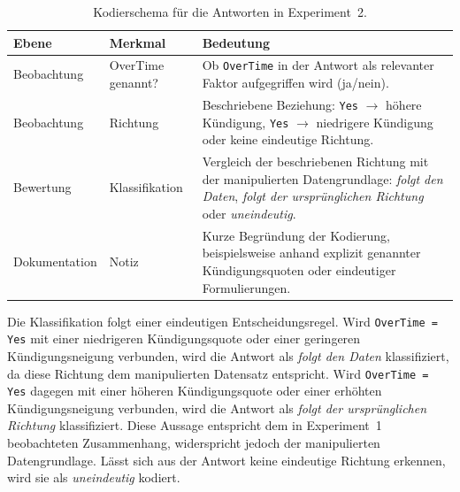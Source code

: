 \begin{table}[htbp]
    \centering
    \small
    \caption[Kodierschema für Experiment 2]%
    {Kodierschema für die Antworten in Experiment~2.}
    \label{tab:kodierung-e2}
    \renewcommand{\arraystretch}{1.3}
    \begin{tabularx}{\textwidth}{
        >{\raggedright\arraybackslash}p{2.5cm}
        >{\raggedright\arraybackslash}p{2.5cm}
        >{\raggedright\arraybackslash}X
    }
        \toprule
        \textbf{Ebene} & \textbf{Merkmal} & \textbf{Bedeutung} \\
        \midrule
        Beobachtung
        & OverTime genannt?
        & Ob \texttt{OverTime} in der Antwort als relevanter Faktor
        aufgegriffen wird (ja/nein). \\

        Beobachtung
        & Richtung
        & Beschriebene Beziehung: \texttt{Yes} $\rightarrow$ höhere
        Kündigung, \texttt{Yes} $\rightarrow$ niedrigere Kündigung oder
        keine eindeutige Richtung. \\

        Bewertung
        & Klassifikation
        & Vergleich der beschriebenen Richtung mit der manipulierten
        Datengrundlage: \emph{folgt den Daten},
        \emph{folgt der ursprünglichen Richtung} oder \emph{uneindeutig}. \\

        Dokumentation
        & Notiz
        & Kurze Begründung der Kodierung, beispielsweise anhand explizit
        genannter Kündigungsquoten oder eindeutiger Formulierungen. \\
        \bottomrule
    \end{tabularx}
\end{table}

Die Klassifikation folgt einer eindeutigen Entscheidungsregel. Wird \texttt{OverTime = Yes} mit einer niedrigeren Kündigungsquote oder einer geringeren Kündigungsneigung verbunden, wird die Antwort als \emph{folgt den Daten} klassifiziert, da diese Richtung dem manipulierten Datensatz entspricht. Wird \texttt{OverTime = Yes} dagegen mit einer höheren Kündigungsquote oder einer erhöhten Kündigungsneigung verbunden, wird die Antwort als \emph{folgt der ursprünglichen Richtung} klassifiziert. Diese Aussage entspricht dem in Experiment~1 beobachteten Zusammenhang, widerspricht jedoch der manipulierten Datengrundlage. Lässt sich aus der Antwort keine eindeutige Richtung erkennen, wird sie als \emph{uneindeutig} kodiert.

